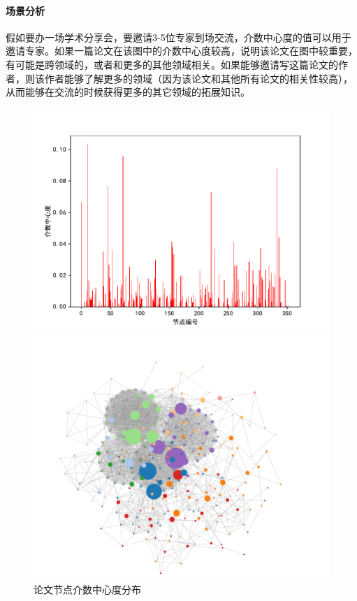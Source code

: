 \documentclass[UTF8, onecolumn, a4paper]{article}
\begin{document}
    \paragraph{场景分析}假如要办一场学术分享会，要邀请3-5位专家到场交流，介数中心度的值可以用于邀请专家。如果一篇论文在该图中的介数中心度较高，说明该论文在图中较重要，有可能是跨领域的，或者和更多的其他领域相关。如果能够邀请写这篇论文的作者，则该作者能够了解更多的领域（因为该论文和其他所有论文的相关性较高），从而能够在交流的时候获得更多的其它领域的拓展知识。
\begin{center}
	\begin{figure}[ht] %
		\centering %
		\begin{minipage}[b]{0.95\linewidth} %
			\begin{minipage}[b]{0.47\linewidth} %
				\centering
				\includegraphics[width=\linewidth]{../pictures/paper_betweeness}
				\caption{论文节点介数中心度分布}
			\end{minipage}
			\hfill
			\begin{minipage}[b]{0.47\linewidth}
				\centering
				\includegraphics[width=\linewidth]{../pictures/show19}

\end{minipage}
\end{minipage}
\end{figure}
\end{center}
\end{document}
